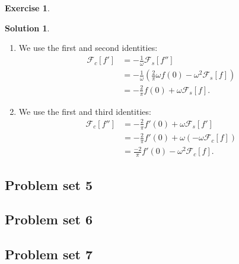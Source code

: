 \documentclass{article}
\theoremstyle{definition}
\newtheorem*{exer*}{Exercise}
\newtheorem*{sln*}{Solution}
\newcommand{\F}{\mathcal{F}}
\begin{document}
\begin{exer*}
\begin{sln*}
\begin{enumerate}
		
		
		
		\item We use the first and second identities:
		\begin{align*}
		\F_c[f'] &= -\frac{1}{\omega}\F_s[f'']\\
		&= -\frac{1}{\omega}\left( \frac{2}{\pi}\omega f(0) - \omega^2 \F_s[f]  \right)\\
		&= -\frac{2}{\pi} f(0) + \omega \F_s[f].
		\end{align*}
		
		\item We use the first and third identities:
		\begin{align*}
		\F_c[f''] &= -\frac{2}{\pi} f'(0) + \omega \F_s[f']\\
		&= -\frac{2}{\pi} f'(0) + \omega\left(-\omega \F_c[f]\right)\\
		&=  \frac{-2}{\pi} f'(0) - \omega^2 \F_c[f].
		\end{align*}
		
		
	\end{enumerate}
	
\end{sln*}

\end{exer*}



\newpage
\subsection{Problem set 5}





\newpage
\subsection{Problem set 6}





\newpage
\subsection{Problem set 7}
\end{document}
